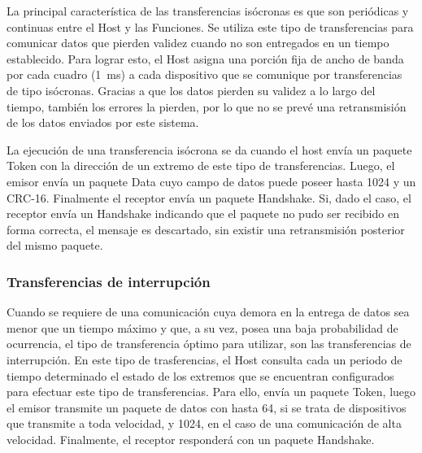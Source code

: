 	La principal característica de las transferencias isócronas es que son periódicas y continuas entre el Host y las Funciones. Se utiliza este tipo de transferencias para comunicar datos que pierden validez cuando no son entregados en un tiempo establecido. Para lograr esto, el Host asigna una porción fija de ancho de banda por cada cuadro (\SI{1}{\milli\second}) a cada dispositivo que se comunique por transferencias de tipo isócronas. Gracias a que los datos pierden su validez a lo largo del tiempo, también los errores la pierden, por lo que no se prevé una retransmisión de los datos enviados por este sistema.%
	
	La ejecución de una transferencia isócrona se da cuando el host envía un paquete Token con la dirección de un extremo de este tipo de transferencias. Luego, el emisor envía un paquete Data cuyo campo de datos puede poseer hasta \SI{1024}{\byte} y un CRC-16. Finalmente el receptor envía un paquete Handshake. Si, dado el caso, el receptor envía un Handshake indicando que el paquete no pudo ser recibido en forma correcta, el mensaje es descartado, sin existir una retransmisión posterior del mismo paquete.
	
\subsubsection{Transferencias de interrupción}
	Cuando se requiere de una comunicación cuya demora en la entrega de datos sea menor que un tiempo máximo y que, a su vez, posea una baja probabilidad de ocurrencia, el tipo de transferencia óptimo para utilizar, son las transferencias de interrupción. En este tipo de trasferencias, el Host consulta cada un periodo de tiempo determinado el estado de los extremos que se encuentran configurados para efectuar este tipo de transferencias. Para ello, envía un paquete Token, luego el emisor transmite un paquete de datos con hasta \SI{64}{\byte}, si se trata de dispositivos que transmite a toda velocidad, y \SI{1024}{\byte}, en el caso de una comunicación de alta velocidad. Finalmente, el receptor responderá con un paquete Handshake.
